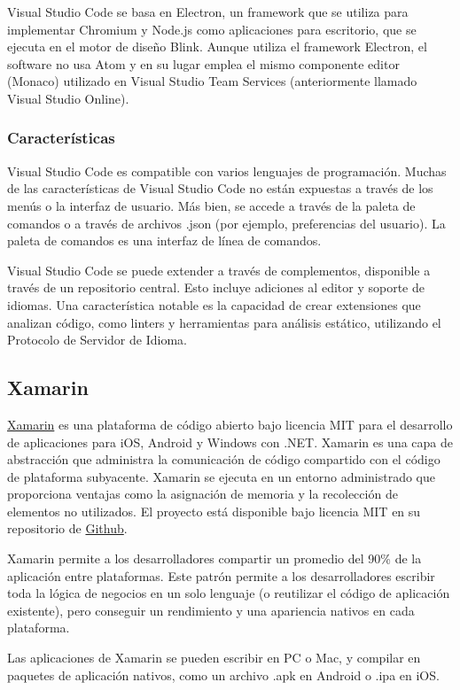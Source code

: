 Visual Studio Code se basa en Electron, un framework que se utiliza para implementar Chromium y Node.js como aplicaciones para escritorio, que se ejecuta en el motor de diseño Blink. Aunque utiliza el framework Electron, el software no usa Atom y en su lugar emplea el mismo componente editor (Monaco) utilizado en Visual Studio Team Services (anteriormente llamado Visual Studio Online).

\subsubsection{Características}
Visual Studio Code es compatible con varios lenguajes de programación. Muchas de las características de Visual Studio Code no están expuestas a través de los menús o la interfaz de usuario. Más bien, se accede a través de la paleta de comandos o a través de archivos .json (por ejemplo, preferencias del usuario). La paleta de comandos es una interfaz de línea de comandos.

Visual Studio Code se puede extender a través de complementos, disponible a través de un repositorio central. Esto incluye adiciones al editor y soporte de idiomas. Una característica notable es la capacidad de crear extensiones que analizan código, como linters y herramientas para análisis estático, utilizando el Protocolo de Servidor de Idioma.

\subsection{Xamarin}
\href{https://dotnet.microsoft.com/apps/xamarin}{Xamarin} es una plataforma de código abierto bajo licencia MIT para el desarrollo de  aplicaciones para iOS, Android y Windows con .NET. Xamarin es una capa de abstracción que administra la comunicación de código compartido con el código de plataforma subyacente. Xamarin se ejecuta en un entorno administrado que proporciona ventajas como la asignación de memoria y la recolección de elementos no utilizados. El proyecto está disponible bajo licencia MIT en su repositorio de \href{https://github.com/xamarin}{Github}.

Xamarin permite a los desarrolladores compartir un promedio del 90\% de la aplicación entre plataformas. Este patrón permite a los desarrolladores escribir toda la lógica de negocios en un solo lenguaje (o reutilizar el código de aplicación existente), pero conseguir un rendimiento y una apariencia nativos en cada plataforma.

Las aplicaciones de Xamarin se pueden escribir en PC o Mac, y compilar en paquetes de aplicación nativos, como un archivo .apk en Android o .ipa en iOS.


